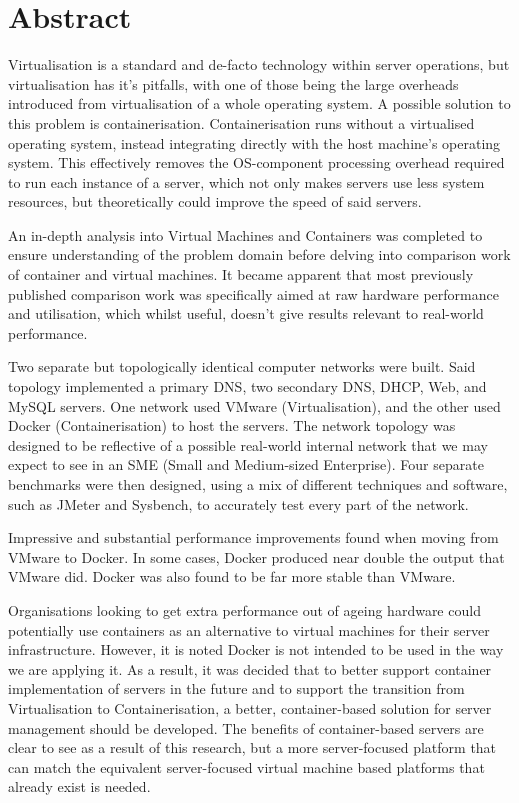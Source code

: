 
\chapter{Abstract}
Virtualisation is a standard and de-facto technology within server operations, but virtualisation has it's pitfalls, with one of those being the large overheads introduced from virtualisation of a whole operating system. A possible solution to this problem is containerisation. Containerisation runs without a virtualised operating system, instead integrating directly with the host machine's operating system. This effectively removes the OS-component processing overhead required to run each instance of a server, which not only makes servers use less system resources, but theoretically could improve the speed of said servers.

An in-depth analysis into Virtual Machines and Containers was completed to ensure understanding of the problem domain before delving into comparison work of container and virtual machines. It became apparent that most previously published comparison work was specifically aimed at raw hardware performance and utilisation, which whilst useful, doesn't give results relevant to real-world performance.

Two separate but topologically identical computer networks were built. Said topology implemented a primary DNS, two secondary DNS, DHCP, Web, and MySQL servers. One network used VMware (Virtualisation), and the other used Docker (Containerisation) to host the servers. The network topology was designed to be reflective of a possible real-world internal network that we may expect to see in an SME (Small and Medium-sized Enterprise). Four separate benchmarks were then designed, using a mix of different techniques and software, such as JMeter and Sysbench, to accurately test every part of the network.

 Impressive and substantial performance improvements found when moving from VMware to Docker. In some cases, Docker produced near double the output that VMware did. Docker was also found to be far more stable than VMware.

Organisations looking to get extra performance out of ageing hardware could potentially use containers as an alternative to virtual machines for their server infrastructure. However, it is noted Docker is not intended to be used in the way we are applying it. As a result, it was decided that to better support container implementation of servers in the future and to support the transition from Virtualisation to Containerisation, a better, container-based solution for server management should be developed. The benefits of container-based servers are clear to see as a result of this research, but a more server-focused platform that can match the equivalent server-focused virtual machine based platforms that already exist is needed.